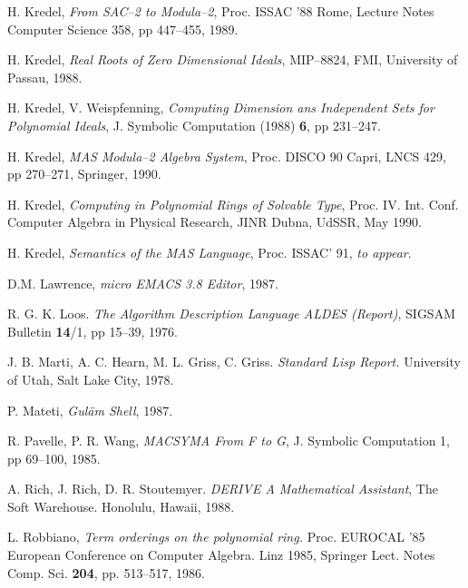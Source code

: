 \begin{thebibliography}{Stoutemyer 86}
 H. Kredel,
        {\em From SAC--2 to Modula--2},
        Proc. ISSAC '88 Rome, Lecture Notes Computer Science 358,
        pp 447--455, 1989.

 H. Kredel,
        {\em Real Roots of Zero Dimensional Ideals},
        MIP--8824, FMI, University of Passau, 1988.

 H. Kredel, V. Weispfenning,
        {\em Computing Dimension ans Independent Sets 
        for Polynomial Ideals},
        J. Symbolic Computation (1988) {\bf 6}, pp 231--247.

 H. Kredel,
        {\em MAS Modula--2 Algebra System},
        Proc. DISCO 90 Capri, LNCS 429, pp 270--271, Springer, 1990.

 H. Kredel,
        {\em Computing in Polynomial Rings of Solvable Type},
        Proc. IV. Int. Conf. Computer Algebra in Physical Research, 
        JINR Dubna, UdSSR, May 1990.

 H. Kredel,
        {\em Semantics of the MAS Language},
        Proc. ISSAC' 91, {\em to appear}.

 D.M. Lawrence,
        {\em micro EMACS 3.8 Editor}, 1987.

 R. G. K. Loos.
        {\em The Algorithm Description Language ALDES (Report)},
        SIGSAM Bulletin {\bf 14}/1, pp 15--39, 1976.

 J. B. Marti,
        A. C. Hearn, M. L. Griss, C. Griss.
        {\em Standard Lisp Report.}
        University of Utah, Salt Lake City, 1978.

 P. Mateti,
        {\em Gul\"am Shell}, 1987.

 R. Pavelle, P. R. Wang,
        {\em MACSYMA From F to G},
        J. Symbolic Computation 1, pp 69--100, 1985.

 A. Rich, J. Rich, D. R. Stoutemyer.
        {\em DERIVE A Mathematical Assistant},
        The Soft Warehouse. Honolulu, Hawaii, 1988.

 L. Robbiano,
        {\em Term orderings on the polynomial ring.}
        Proc. EUROCAL '85
        European Conference on Computer Algebra.
        Linz 1985,
        Springer Lect. Notes Comp. Sci. {\bf 204}, pp. 513--517, 1986.


\end{thebibliography}
